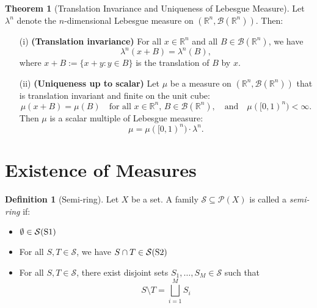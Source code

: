 \documentclass[12pt]{article}
\theoremstyle{definition}
\newtheorem{definition}{Definition}[section]
\newtheorem{theorem}{Theorem}[section]
\begin{document}
\medskip
\begin{theorem}[Translation Invariance and Uniqueness of Lebesgue Measure]
Let \( \lambda^n \) denote the \( n \)-dimensional Lebesgue measure on \( (\mathbb{R}^n, \mathcal{B}(\mathbb{R}^n)) \). Then:

\begin{itemize}
  \item[(i)] \textbf{(Translation invariance)}  
  For all \( x \in \mathbb{R}^n \) and all \( B \in \mathcal{B}(\mathbb{R}^n) \), we have
  \[
  \lambda^n(x + B) = \lambda^n(B),
  \]
  where \( x + B := \{ x + y : y \in B \} \) is the translation of \( B \) by \( x \).

  \item[(ii)] \textbf{(Uniqueness up to scalar)}  
  Let \( \mu \) be a measure on \( (\mathbb{R}^n, \mathcal{B}(\mathbb{R}^n)) \) that is translation invariant and finite on the unit cube:
  \[
  \mu(x + B) = \mu(B) \quad \text{for all } x \in \mathbb{R}^n,\, B \in \mathcal{B}(\mathbb{R}^n), \quad \text{and} \quad \mu([0,1)^n) < \infty.
  \]
  Then \( \mu \) is a scalar multiple of Lebesgue measure:
  \[
  \mu = \mu([0,1)^n) \cdot \lambda^n.
  \]
\end{itemize}
\end{theorem}


\vspace{3em}
\section{Existence of Measures}

\medskip
\begin{definition}[Semi-ring]
Let \( X \) be a set. A family \( \mathcal{S} \subseteq \mathcal{P}(X) \) is called a \emph{semi-ring} if:
\begin{itemize}
  \item \( \emptyset \in \mathcal{S} \hfill \textnormal{(S1)} \)
  
  \item For all \( S, T \in \mathcal{S} \), we have \( S \cap T \in \mathcal{S} \hfill \textnormal{(S2)} \)
  
  \item For all \( S, T \in \mathcal{S} \), there exist disjoint sets \( S_1, \dots, S_M \in \mathcal{S} \) such that
  \[
  S \setminus T = \bigsqcup_{i=1}^M S_i \tag*{(S3)}
  \]
\end{itemize}
\end{definition}
\end{document}

